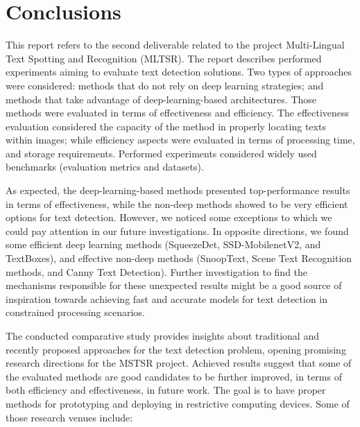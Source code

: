 \section{Conclusions}
\label{sec:conclusions}

This report refers to the second deliverable related to the project Multi-Lingual Text Spotting and Recognition (MLTSR). The report describes performed experiments aiming to evaluate text detection solutions. Two types of approaches were considered: methods that do not rely on deep learning strategies; and methods that take advantage of deep-learning-based architectures. Those methods were evaluated in terms of effectiveness and efficiency. The effectiveness evaluation considered the capacity of the method in properly locating texts within images; while efficiency aspects were evaluated in terms of processing time, and storage requirements. Performed experiments considered widely used benchmarks (evaluation metrics and datasets). 

As expected, the deep-learning-based methods presented top-performance results in terms of effectiveness, while the non-deep methods showed to be very efficient options for text detection. However, we noticed some exceptions to which we could pay attention in our future investigations. In opposite directions, we found some efficient deep learning methods (SqueezeDet, SSD-MobilenetV2, and TextBoxes), and effective non-deep methods (SnoopText, Scene Text Recognition methods, and Canny Text Detection). Further investigation to find the mechanisms responsible for these unexpected results might be a good source of inspiration towards achieving fast and accurate models for text detection in constrained processing scenarios.

The conducted comparative study provides insights about traditional and recently proposed approaches for the text detection problem, opening promising research directions for the MSTSR project.
Achieved results suggest that some of the evaluated methods are good candidates to be further improved, in terms of both efficiency and effectiveness, in future work. The goal is to have proper methods for prototyping and deploying in restrictive computing devices. 
Some of those research venues include:


